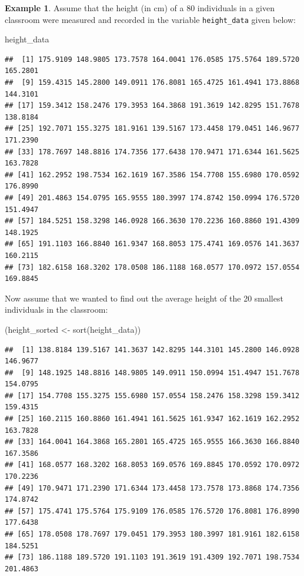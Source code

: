 \documentclass[
]{book}
\newenvironment{Shaded}{\begin{snugshade}}{\end{snugshade}}
\newcommand{\FunctionTok}[1]{\textcolor[rgb]{0.00,0.00,0.00}{#1}}
\newcommand{\NormalTok}[1]{#1}
\newcommand{\OtherTok}[1]{\textcolor[rgb]{0.56,0.35,0.01}{#1}}
\theoremstyle{definition}
\theoremstyle{definition}
\newtheorem{example}{Example}[chapter]
\theoremstyle{definition}
\theoremstyle{definition}
\theoremstyle{remark}
\begin{document}
\begin{example}

Assume that the height (in cm) of a 80 individuals in a given classroom were measured and recorded in the variable \texttt{height\_data} given below:

\begin{Shaded}
\begin{Highlighting}[]
\NormalTok{height\_data}
\end{Highlighting}
\end{Shaded}

\begin{verbatim}
##  [1] 175.9109 148.9805 173.7578 164.0041 176.0585 175.5764 189.5720 165.2801
##  [9] 159.4315 145.2800 149.0911 176.8081 165.4725 161.4941 173.8868 144.3101
## [17] 159.3412 158.2476 179.3953 164.3868 191.3619 142.8295 151.7678 138.8184
## [25] 192.7071 155.3275 181.9161 139.5167 173.4458 179.0451 146.9677 171.2390
## [33] 178.7697 148.8816 174.7356 177.6438 170.9471 171.6344 161.5625 163.7828
## [41] 162.2952 198.7534 162.1619 167.3586 154.7708 155.6980 170.0592 176.8990
## [49] 201.4863 154.0795 165.9555 180.3997 174.8742 150.0994 176.5720 151.4947
## [57] 184.5251 158.3298 146.0928 166.3630 170.2236 160.8860 191.4309 148.1925
## [65] 191.1103 166.8840 161.9347 168.8053 175.4741 169.0576 141.3637 160.2115
## [73] 182.6158 168.3202 178.0508 186.1188 168.0577 170.0972 157.0554 169.8845
\end{verbatim}

Now assume that we wanted to find out the average height of the 20 smallest individuals in the classroom:

\begin{Shaded}
\begin{Highlighting}[]
\NormalTok{(height\_sorted }\OtherTok{\textless{}{-}} \FunctionTok{sort}\NormalTok{(height\_data))}
\end{Highlighting}
\end{Shaded}

\begin{verbatim}
##  [1] 138.8184 139.5167 141.3637 142.8295 144.3101 145.2800 146.0928 146.9677
##  [9] 148.1925 148.8816 148.9805 149.0911 150.0994 151.4947 151.7678 154.0795
## [17] 154.7708 155.3275 155.6980 157.0554 158.2476 158.3298 159.3412 159.4315
## [25] 160.2115 160.8860 161.4941 161.5625 161.9347 162.1619 162.2952 163.7828
## [33] 164.0041 164.3868 165.2801 165.4725 165.9555 166.3630 166.8840 167.3586
## [41] 168.0577 168.3202 168.8053 169.0576 169.8845 170.0592 170.0972 170.2236
## [49] 170.9471 171.2390 171.6344 173.4458 173.7578 173.8868 174.7356 174.8742
## [57] 175.4741 175.5764 175.9109 176.0585 176.5720 176.8081 176.8990 177.6438
## [65] 178.0508 178.7697 179.0451 179.3953 180.3997 181.9161 182.6158 184.5251
## [73] 186.1188 189.5720 191.1103 191.3619 191.4309 192.7071 198.7534 201.4863
\end{verbatim}


\end{example}
\end{document}
